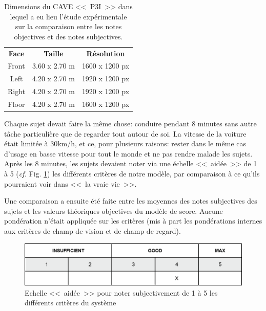 	\begin{table}[h]
		\centering
		\caption{Dimensions du CAVE <<~P3I~>> dans lequel a eu lieu l'étude expérimentale sur la comparaison entre les notes objectives et des notes subjectives.}
		\label{tab:cave_dimensions}
		\small
		\begin{tabular}{ccc}
			\multicolumn{1}{c}{\bfseries Face} & \multicolumn{1}{c}{\bfseries Taille} & \multicolumn{1}{c}{\bfseries Résolution}\\
			Front & 3.60 x 2.70 m & 1600 x 1200 px\\
			Left & 4.20 x 2.70 m & 1920 x 1200 px\\
			Right & 4.20 x 2.70 m & 1920 x 1200 px\\
			Floor & 4.20 x 2.70 m & 1600 x 1200 px\\
		\end{tabular}
	\end{table}
	 
	 \par Chaque sujet devait faire la même chose: conduire pendant 8 minutes sans autre tâche particulière que de regarder tout autour de soi. La vitesse de la voiture était limitée à 30km/h, et ce, pour plusieurs raisons: rester dans le même cas d'usage en basse vitesse pour tout le monde et ne pas rendre malade les sujets. Après les 8 minutes, les sujets devaient noter via une échelle <<~aidée~>> de 1 à 5 (\textit{cf.} Fig. \ref{fig:aided_scale}) les différents critères de notre modèle, par comparaison à ce qu'ils pourraient voir dans <<~la vraie vie~>>.
	 
	 \par Une comparaison a ensuite été faite entre les moyennes des notes subjectives des sujets et les valeurs théoriques objectives du modèle de score. Aucune pondération n'était appliquée sur les critères (mis à part les pondérations internes aux critères de champ de vision et de champ de regard).
	
	\begin{figure}
		\centering
		\includegraphics[scale=1]{Figures/AidedScale}
		\caption{Echelle <<~aidée~>> pour noter subjectivement de 1 à 5 les différents critères du système}
		\label{fig:aided_scale}
	\end{figure}
	
